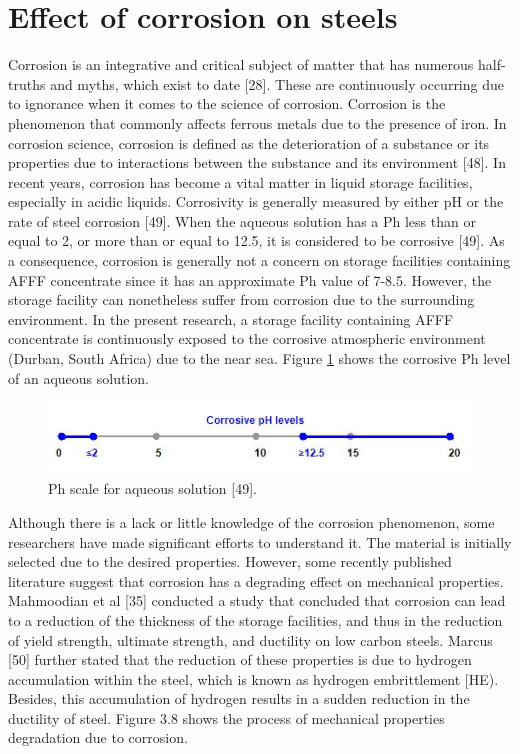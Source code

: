 \documentclass[12pt]{report}
\begin{document}
\section{Effect of corrosion on steels}
Corrosion is an integrative and critical subject of matter that has numerous half-truths and myths, which exist to date [28]. These are continuously occurring due to ignorance when it comes to the science of corrosion.  Corrosion is the phenomenon that commonly affects ferrous metals due to the presence of iron. In corrosion science, corrosion is defined as the deterioration of a substance or its properties due to interactions between the substance and its environment [48].
In recent years, corrosion has become a vital matter in liquid storage facilities, especially in acidic liquids. Corrosivity is generally measured by either pH or the rate of steel corrosion [49]. When the aqueous solution has a Ph less than or equal to 2, or more than or equal to 12.5, it is considered to be corrosive [49]. As a consequence, corrosion is generally not a concern on storage facilities containing AFFF concentrate since it has an approximate Ph value of 7-8.5. However, the storage facility can nonetheless suffer from corrosion due to the surrounding environment. In the present research, a storage facility containing AFFF concentrate is continuously exposed to the corrosive atmospheric environment (Durban, South Africa) due to the near sea. Figure \ref{ch3:figure:ph} shows the corrosive Ph level of an aqueous solution. 
 
\begin{figure}[H]
    \centering
    \includegraphics[width=.8\textwidth]{aqueous_solution_ph_scale.jpg}
    \caption{Ph scale for aqueous solution [49].}
    \label{ch3:figure:ph}
\end{figure}

Although there is a lack or little knowledge of the corrosion phenomenon, some researchers have made significant efforts to understand it. The material is initially selected due to the desired properties. However, some recently published literature suggest that corrosion has a degrading effect on mechanical properties. Mahmoodian et al [35] conducted a study that concluded that corrosion can lead to a reduction of the thickness of the storage facilities, and thus in the reduction of yield strength, ultimate strength, and ductility on low carbon steels.  Marcus [50] further stated that the reduction of these properties is due to hydrogen accumulation within the steel, which is known as hydrogen embrittlement [HE). Besides, this accumulation of hydrogen results in a sudden reduction in the ductility of steel. Figure 3.8 shows the process of mechanical properties degradation due to corrosion.
 
\end{document}
